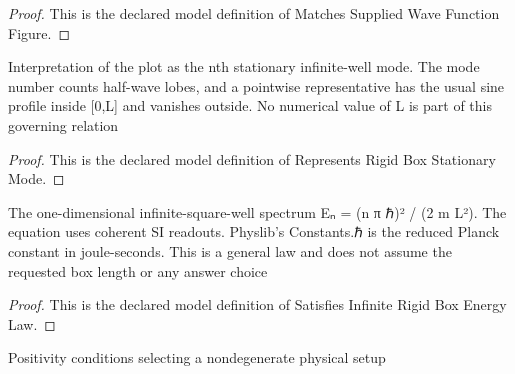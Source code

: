 \begin{proof}
  This is the declared model definition of Matches Supplied Wave Function Figure.
\end{proof}
\begin{definition}
  \label{def:physics:phyx-mini-0656:phyxminiproblems-problemphyxmini0656-representsrigidboxstationarymode}
  Interpretation of the plot as the nth stationary infinite-well mode. The mode number counts half-wave lobes, and a pointwise representative has the usual sine profile inside [0,L] and vanishes outside. No numerical value of L is part of this governing relation
\end{definition}
\begin{proof}
  This is the declared model definition of Represents Rigid Box Stationary Mode.
\end{proof}
\begin{definition}
  \label{def:physics:phyx-mini-0656:phyxminiproblems-problemphyxmini0656-satisfiesinfiniterigidboxenergylaw}
  The one-dimensional infinite-square-well spectrum Eₙ = (n π ℏ)² / (2 m L²). The equation uses coherent SI readouts. Physlib's Constants.ℏ is the reduced Planck constant in joule-seconds. This is a general law and does not assume the requested box length or any answer choice
\end{definition}
\begin{proof}
  This is the declared model definition of Satisfies Infinite Rigid Box Energy Law.
\end{proof}
\begin{definition}
  \label{def:physics:phyx-mini-0656:phyxminiproblems-problemphyxmini0656-hasphysicalrigidboxparameters}
  Positivity conditions selecting a nondegenerate physical setup
\end{definition}
